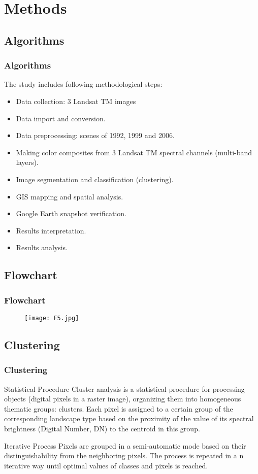 \documentclass[pdflatex,compress,10pt,
	xcolor={dvipsnames,dvipsnames,svgnames,x11names,table},
	hyperref={
	breaklinks = true, 
	pdfauthor={Lemenkova Polina}, 
	pdfsubject={Preentation}, 
	pdfcreator={Lemenkova Polina}, 
	pdfproducer={Lemenkova Polina}, 
	citecolor=NavyBlue, 
	urlcolor = NavyBlue, 
	breaklinks = true}]{beamer}
\begin{document}
\section{Methods}
\subsection{Algorithms}
\begin{frame}\frametitle{Algorithms}
The study includes following methodological steps:
\begin{itemize}
	\item Data collection: 3 Landsat TM images
	\item Data import and conversion.
	\item Data preprocessing: scenes of 1992, 1999 and 2006.
	\item Making color composites from 3 Landsat TM spectral channels (multi-band layers).
	\item Image segmentation and classification (clustering).
	\item GIS mapping and spatial analysis.
	\item Google Earth snapshot verification.
	\item Results interpretation.
	\item Results analysis.
\end{itemize}
\end{frame}

\subsection{Flowchart}
\begin{frame}\frametitle{Flowchart}
\begin{figure}[H]
	\centering
		\texttt{[image: F5.jpg]}
\end{figure}
\end{frame}

\subsection{Clustering}
\begin{frame}\frametitle{Clustering}

\begin{alertblock}{Statistical Procedure}
Cluster analysis is a statistical procedure for processing objects (digital pixels in a raster image), organizing them into homogeneous thematic groups: clusters. Each  pixel is assigned to a certain group of the corresponding landscape type based on the proximity of the value of its spectral brightness (Digital Number, DN) to the centroid in this group.
\end{alertblock}

\begin{block}{Iterative Process}
Pixels are grouped in a semi-automatic mode based on their distinguishability from the neighboring pixels. The process is repeated in a n iterative way until optimal values of classes and pixels is reached. 
\end{block}
\end{frame}
\end{document}
